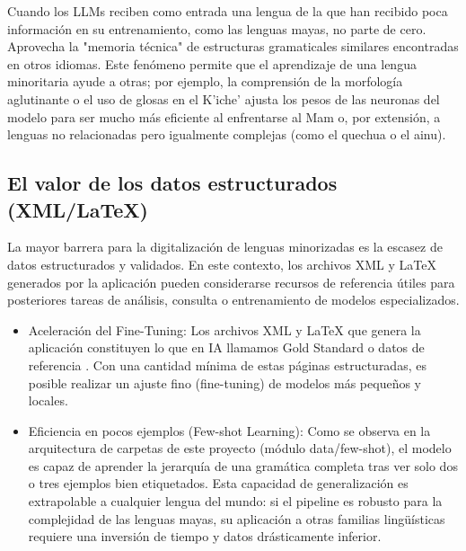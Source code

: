 Cuando los LLMs reciben como entrada una lengua de la que han recibido poca información en su entrenamiento, como las lenguas mayas, no parte de cero. Aprovecha la "memoria técnica" de estructuras gramaticales similares encontradas en otros idiomas. Este fenómeno permite que el aprendizaje de una lengua minoritaria ayude a otras; por ejemplo, la comprensión de la morfología aglutinante o el uso de glosas en el K’iche’ ajusta los pesos de las neuronas del modelo para ser mucho más eficiente al enfrentarse al Mam o, por extensión, a lenguas no relacionadas pero igualmente complejas (como el quechua o el ainu).

\subsection{ El valor de los datos estructurados (XML/LaTeX) }
La mayor barrera para la digitalización de lenguas minorizadas es la escasez de datos estructurados y validados. En este contexto, los archivos XML y \LaTeX{} generados por la aplicación pueden considerarse recursos de referencia útiles para posteriores tareas de análisis, consulta o entrenamiento de modelos especializados.
\begin{itemize}
    \item Aceleración del Fine-Tuning: Los archivos XML y LaTeX que genera la aplicación constituyen lo que en IA llamamos Gold Standard o datos de referencia \parencite{cardoso_pereira_iversen_ramos_2014}. Con una cantidad mínima de estas páginas estructuradas, es posible realizar un ajuste fino (fine-tuning) de modelos más pequeños y locales.
    \item Eficiencia en pocos ejemplos (Few-shot Learning): Como se observa en la arquitectura de carpetas de este proyecto (módulo data/few-shot), el modelo es capaz de aprender la jerarquía de una gramática completa tras ver solo dos o tres ejemplos bien etiquetados. Esta capacidad de generalización es extrapolable a cualquier lengua del mundo: si el pipeline es robusto para la complejidad de las lenguas mayas, su aplicación a otras familias lingüísticas requiere una inversión de tiempo y datos drásticamente inferior.
\end{itemize}

